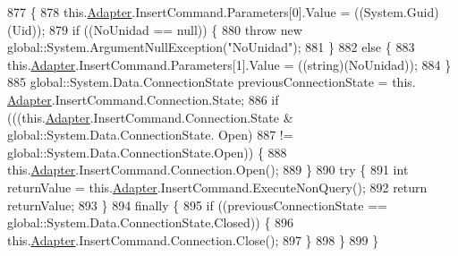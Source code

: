 \begin{DoxyCode}
877                                                                     \{
878             this.\hyperlink{class_proyecto___integrador__3_1_1ds_unidad_table_adapters_1_1_unidad_table_adapter_a85041318aa5a0582ef54f4af0d332411}{Adapter}.InsertCommand.Parameters[0].Value = ((System.Guid)(Uid));
879             \textcolor{keywordflow}{if} ((NoUnidad == null)) \{
880                 \textcolor{keywordflow}{throw} \textcolor{keyword}{new} global::System.ArgumentNullException(\textcolor{stringliteral}{"NoUnidad"});
881             \}
882             \textcolor{keywordflow}{else} \{
883                 this.\hyperlink{class_proyecto___integrador__3_1_1ds_unidad_table_adapters_1_1_unidad_table_adapter_a85041318aa5a0582ef54f4af0d332411}{Adapter}.InsertCommand.Parameters[1].Value = ((string)(NoUnidad));
884             \}
885             global::System.Data.ConnectionState previousConnectionState = this.
      \hyperlink{class_proyecto___integrador__3_1_1ds_unidad_table_adapters_1_1_unidad_table_adapter_a85041318aa5a0582ef54f4af0d332411}{Adapter}.InsertCommand.Connection.State;
886             \textcolor{keywordflow}{if} (((this.\hyperlink{class_proyecto___integrador__3_1_1ds_unidad_table_adapters_1_1_unidad_table_adapter_a85041318aa5a0582ef54f4af0d332411}{Adapter}.InsertCommand.Connection.State & global::System.Data.ConnectionState.
      Open) 
887                         != global::System.Data.ConnectionState.Open)) \{
888                 this.\hyperlink{class_proyecto___integrador__3_1_1ds_unidad_table_adapters_1_1_unidad_table_adapter_a85041318aa5a0582ef54f4af0d332411}{Adapter}.InsertCommand.Connection.Open();
889             \}
890             \textcolor{keywordflow}{try} \{
891                 \textcolor{keywordtype}{int} returnValue = this.\hyperlink{class_proyecto___integrador__3_1_1ds_unidad_table_adapters_1_1_unidad_table_adapter_a85041318aa5a0582ef54f4af0d332411}{Adapter}.InsertCommand.ExecuteNonQuery();
892                 \textcolor{keywordflow}{return} returnValue;
893             \}
894             \textcolor{keywordflow}{finally} \{
895                 \textcolor{keywordflow}{if} ((previousConnectionState == global::System.Data.ConnectionState.Closed)) \{
896                     this.\hyperlink{class_proyecto___integrador__3_1_1ds_unidad_table_adapters_1_1_unidad_table_adapter_a85041318aa5a0582ef54f4af0d332411}{Adapter}.InsertCommand.Connection.Close();
897                 \}
898             \}
899         \}
\end{DoxyCode}

